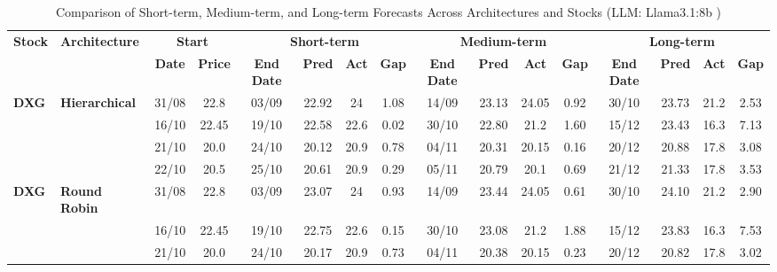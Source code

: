 \clearpage
\onecolumn  
\begin{table}[!h]
\centering
\caption{Comparison of Short-term, Medium-term, and Long-term Forecasts Across Architectures and Stocks (LLM: Llama3.1:8b )}
\label{tab:full_forecast}
\setlength{\tabcolsep}{3pt}
\renewcommand{\arraystretch}{1.05}
\scriptsize
\begin{tabular}{llcc|cccc|cccc|cccc}
\toprule
\multirow{2}{*}{\textbf{Stock}} &
\multirow{2}{*}{\textbf{Architecture}} &
\multicolumn{2}{c|}{\textbf{Start}} &
\multicolumn{4}{c|}{\textbf{Short-term}} &
\multicolumn{4}{c|}{\textbf{Medium-term}} &
\multicolumn{4}{c}{\textbf{Long-term}} \\
\cmidrule(lr){3-4}
\cmidrule(lr){5-8}
\cmidrule(lr){9-12}
\cmidrule(lr){13-16}
& &
\textbf{Date} & \textbf{Price} &
\textbf{End Date} & \textbf{Pred} & \textbf{Act} & \textbf{Gap} &
\textbf{End Date} & \textbf{Pred} & \textbf{Act} & \textbf{Gap} &
\textbf{End Date} & \textbf{Pred} & \textbf{Act} & \textbf{Gap} \\
\midrule


\multirow{4}{*}{\textbf{DXG}} 
& \textbf{Hierarchical}
& 31/08 & 22.8 & 03/09 & 22.92 & 24 & 1.08 & 14/09 & 23.13 & 24.05 & 0.92 & 30/10 & 23.73 & 21.2 & 2.53 \\

& 
& 16/10 & 22.45 & 19/10 & 22.58 & 22.6 & 0.02 & 30/10 & 22.80 & 21.2 & 1.60 & 15/12 & 23.43 & 16.3 & 7.13 \\

& 
& 21/10 & 20.0 & 24/10 & 20.12 & 20.9 & 0.78 & 04/11 & 20.31 & 20.15 & 0.16 & 20/12 & 20.88 & 17.8 & 3.08 \\

&
& 22/10 & 20.5 & 25/10 & 20.61 & 20.9 & 0.29 & 05/11 & 20.79 & 20.1 & 0.69 & 21/12 & 21.33 & 17.8 & 3.53 \\
\midrule


\multirow{4}{*}{\textbf{DXG}} 
& \textbf{Round Robin}
& 31/08 & 22.8 & 03/09 & 23.07 & 24 & 0.93 & 14/09 & 23.44 & 24.05 & 0.61 & 30/10 & 24.10 & 21.2 & 2.90 \\

&
& 16/10 & 22.45 & 19/10 & 22.75 & 22.6 & 0.15 & 30/10 & 23.08 & 21.2 & 1.88 & 15/12 & 23.83 & 16.3 & 7.53 \\

&
& 21/10 & 20.0 & 24/10 & 20.17 & 20.9 & 0.73 & 04/11 & 20.38 & 20.15 & 0.23 & 20/12 & 20.82 & 17.8 & 3.02 \\


\end{tabular}
\end{table}
